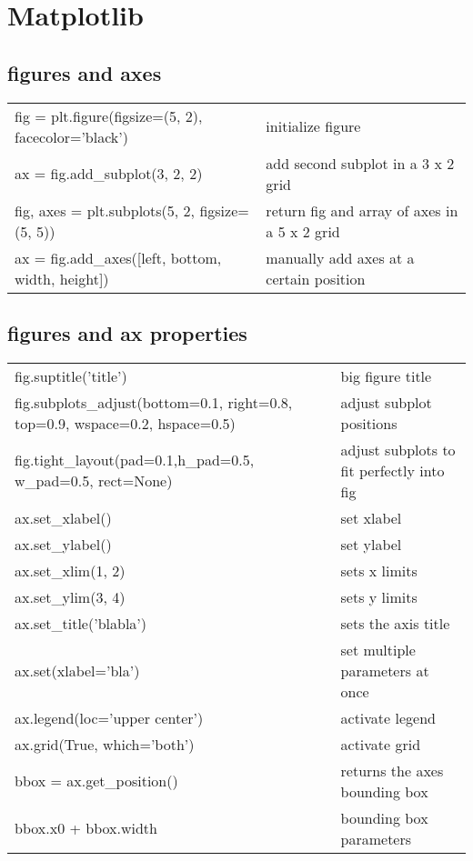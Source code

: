 \documentclass[10pt, a4paper, twocolumn]{article}
\begin{document}
\newpage
\section*{Matplotlib}
\subsection*{figures and axes}
\begin{tabular}{ p{} p{} }
  fig = plt.figure(figsize=(5, 2), facecolor='black') & initialize figure\\
  ax = fig.add\_subplot(3, 2, 2) & add second subplot in a 3 x 2 grid\\
  fig, axes = plt.subplots(5, 2, figsize=(5, 5)) & return fig and array of axes in a 5 x 2 grid\\
  ax = fig.add\_axes([left, bottom, width, height]) & manually add axes at a certain position\\
\end{tabular}

\subsection*{figures and ax properties}
\begin{tabular}{ p{} p{} }
  fig.suptitle('title') & big figure title\\
  fig.subplots\_adjust(bottom=0.1, right=0.8, top=0.9, wspace=0.2, hspace=0.5) & adjust subplot positions\\
  fig.tight\_layout(pad=0.1,h\_pad=0.5, w\_pad=0.5, rect=None) & adjust subplots to fit perfectly into fig\\
  ax.set\_xlabel() & set xlabel\\
  ax.set\_ylabel() & set ylabel\\
  ax.set\_xlim(1, 2) & sets x limits\\
  ax.set\_ylim(3, 4) & sets y limits\\
  ax.set\_title('blabla') & sets the axis title\\
  ax.set(xlabel='bla') & set multiple parameters at once\\ 
  ax.legend(loc='upper center') & activate legend\\
  ax.grid(True, which='both') & activate grid\\
  bbox = ax.get\_position() & returns the axes bounding box\\
  bbox.x0 + bbox.width & bounding box parameters\\
\end{tabular}
\end{document}

